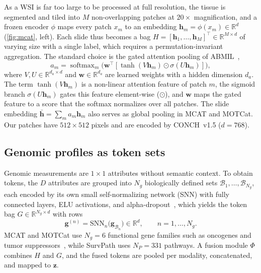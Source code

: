 \documentclass[10pt,twocolumn,letterpaper]{article}
\newcommand{\R}{\mathbb{R}}
\DeclareMathOperator{\softmax}{softmax}
\begin{document}
As a WSI is far too large to be processed at full resolution, the tissue is segmented and tiled into $M$ non-overlapping patches at $20\times$ magnification, and a frozen encoder $\phi$ maps every patch $x_m$ to an embedding $\mathbf{h}_m=\phi(x_m)\in\R^{d}$ (\cref{fig:mcat}, left). Each slide thus becomes a bag $H=[\mathbf{h}_1,\dots,\mathbf{h}_M]^\top\in\R^{M\times d}$ of varying size with a single label, which requires a permutation-invariant aggregation. The standard choice is the gated attention pooling of ABMIL~\cite{ilse2018attention},
\begin{equation}
  a_m = \softmax_m\big(\mathbf{w}^\top[\tanh(V\mathbf{h}_m)\odot\sigma(U\mathbf{h}_m)]\big), \label{eq:abmil}
\end{equation}
where $V,U\in\R^{d_a\times d}$ and $\mathbf{w}\in\R^{d_a}$ are learned weights with a hidden dimension $d_a$. The term $\tanh(V\mathbf{h}_m)$ is a non-linear attention feature of patch $m$, the sigmoid branch $\sigma(U\mathbf{h}_m)$ gates this feature element-wise ($\odot$), and $\mathbf{w}$ maps the gated feature to a score that the softmax normalizes over all patches. The slide embedding $\bar{\mathbf{h}}=\sum_{m}a_m\mathbf{h}_m$ also serves as global pooling in MCAT and MOTCat. Our patches have $512\times512$ pixels and are encoded by CONCH~v1.5 ($d=768$).

\subsection{Genomic profiles as token sets}
\label{sec:genomics}

Genomic measurements are $1\times1$ attributes without semantic context. To obtain tokens, the $D$ attributes are grouped into $N_g$ biologically defined sets $\mathcal{B}_1,\dots,\mathcal{B}_{N_g}$, each encoded by its own small self-normalizing network (SNN) with fully connected layers, ELU activations, and alpha-dropout~\cite{chen2021mcat,jaume2024survpath}, which yields the token bag $G\in\R^{N_g\times d}$ with rows
\begin{equation}
  \mathbf{g}^{(n)}=\mathrm{SNN}_n\big(\mathbf{g}_{\mathcal{B}_n}\big)\in\R^{d}, \qquad n=1,\dots,N_g. \label{eq:genomic_tokens}
\end{equation}
MCAT and MOTCat use $N_g=6$ functional gene families such as oncogenes and tumor suppressors~\cite{chen2021mcat}, while SurvPath uses $N_P=331$ pathways. A fusion module $\Phi$ combines $H$ and $G$, and the fused tokens are pooled per modality, concatenated, and mapped to $\mathbf{z}$.
\end{document}
